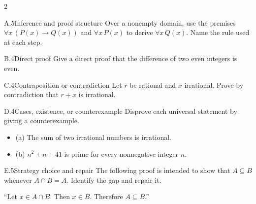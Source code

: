 \documentclass[9pt]{extarticle}
\begin{document}
\begin{multicols}{2}
\begin{CoreProblem}{A.5}{Inference and proof structure}
Over a nonempty domain, use the premises
$\forall x\,(P(x)\to Q(x))$ and $\forall x\,P(x)$ to derive
$\forall x\,Q(x)$. Name the rule used at each step.
\end{CoreProblem}
\begin{CoreProblem}{B.4}{Direct proof}
Give a direct proof that the difference of two even integers is even.
\end{CoreProblem}
\begin{CoreProblem}{C.4}{Contraposition or contradiction}
Let $r$ be rational and $x$ irrational. Prove by contradiction that $r+x$ is irrational.
\end{CoreProblem}
\columnbreak
\begin{CoreProblem}{D.4}{Cases, existence, or counterexample}
Disprove each universal statement by giving a counterexample.
\begin{itemize}
  \item (a) The sum of two irrational numbers is irrational.
  \item (b) $n^2+n+41$ is prime for every nonnegative integer $n$.
\end{itemize}
\end{CoreProblem}
\begin{CoreProblem}{E.5}{Strategy choice and repair}
The following proof is intended to show that $A\subseteq B$ whenever
$A\cap B=A$. Identify the gap and repair it.

``Let $x\in A\cap B$. Then $x\in B$. Therefore $A\subseteq B$.''
\end{CoreProblem}
\end{multicols}
\CoreWorkArea
\FormBreak
{}
\end{document}
